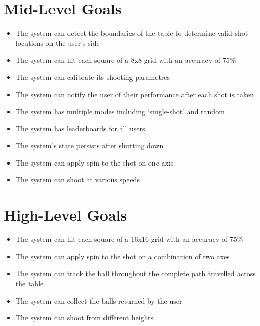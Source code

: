 \documentclass[11pt]{article}
\begin{document}
\section{Mid-Level Goals}
\begin{itemize}
\item The system can detect the boundaries of the table to determine valid shot locations on the user's side
\item The system can hit each square of a 8x8 grid with an accuracy of 75\%
\item The system can calibrate its shooting parametres
\item The system can notify the user of their performance after each shot is taken
\item The system has multiple modes including `single-shot' and random
\item The system has leaderboards for all users
\item The system's state persists after shutting down
\item The system can apply spin to the shot on one axis
\item The system can shoot at various speeds
\end{itemize}
\section{High-Level Goals}
\begin{itemize}
\item The system can hit each square of a 16x16 grid with an accuracy of 75\%
\item The system can apply spin to the shot on a combination of two axes
\item The system can track the ball throughout the complete path travelled across the table
\item The system can collect the balls returned by the user
\item The system can shoot from different heights
\end{itemize}
\end{document}
